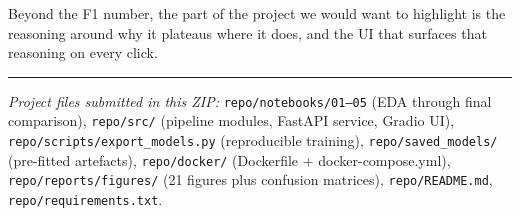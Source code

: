 Beyond the F1 number, the part of the project we would want to highlight
is the reasoning around why it plateaus where it does, and the UI that
surfaces that reasoning on every click.

\begin{center}\rule{0.5\linewidth}{0.5pt}\end{center}

\emph{Project files submitted in this ZIP:}
\texttt{repo/notebooks/01–05} (EDA through final comparison),
\texttt{repo/src/} (pipeline modules, FastAPI service, Gradio UI),
\texttt{repo/scripts/export\_models.py} (reproducible training),
\texttt{repo/saved\_models/} (pre-fitted artefacts),
\texttt{repo/docker/} (Dockerfile + docker-compose.yml),
\texttt{repo/reports/figures/} (21 figures plus confusion matrices),
\texttt{repo/README.md}, \texttt{repo/requirements.txt}.

